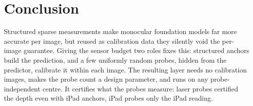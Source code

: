 \section{Conclusion}
\label{sec:conclusion}

Structured sparse measurements make monocular foundation models far more accurate per image, but reused as calibration data they silently void the per-image guarantee.
Giving the sensor budget two roles fixes this: structured anchors build the prediction, and a few uniformly random probes, hidden from the predictor, calibrate it within each image.
The resulting layer needs no calibration images, makes the probe count a design parameter, and runs on any probe-independent centre.
It certifies what the probes measure: laser probes certified the depth even with iPad anchors, iPad probes only the iPad reading.
